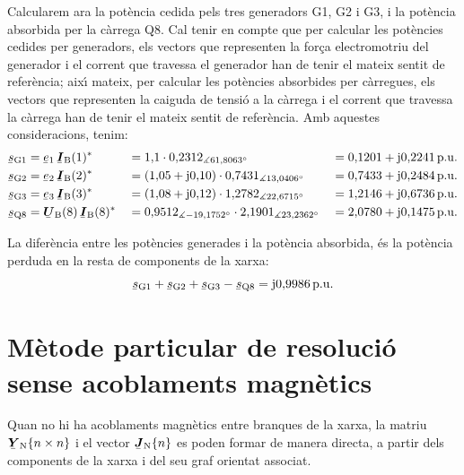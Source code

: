 \begin{exemple}
Calcularem ara la pot\`{e}ncia cedida pels tres generadors G1, G2 i G3, i la pot\`{e}ncia absorbida per la c\`{a}rrega Q8. Cal tenir en compte que per calcular les pot\`{e}ncies cedides per generadors, els vectors que representen la for\c{c}a electromotriu del generador i el corrent que travessa el generador han de tenir el mateix sentit de refer\`{e}ncia; aix\'{\i} mateix, per calcular les pot\`{e}ncies absorbides per c\`{a}rregues, els vectors que representen la caiguda de tensi\'{o} a la c\`{a}rrega i el corrent que travessa la c\`{a}rrega han de tenir el mateix sentit de refer\`{e}ncia. Amb aquestes consideracions, tenim:
\begin{alignat*}{3}
   \cmplx{s}\ped{G1} &= \cmplx{e}\ped{1} \, \mcmplx{I}\ped{B}(1)^* &&= 1{,}1 \cdot
    0{,}2312_{\measuredangle 61{,}8063\degree} &&= 0{,}1201 + \ju 0{,}2241 \unit{p.u.} \\
   \cmplx{s}\ped{G2} &= \cmplx{e}\ped{2} \, \mcmplx{I}\ped{B}(2)^* &&=
   (1{,}05 + \ju 0{,}10) \cdot 0{,}7431_{\measuredangle 13{,}0406\degree} &&=
   0{,}7433 + \ju 0{,}2484\unit{p.u.}   \\
   \cmplx{s}\ped{G3} &= \cmplx{e}\ped{3} \, \mcmplx{I}\ped{B}(3)^* &&=
   (1{,}08 + \ju 0{,}12) \cdot 1{,}2782_{\measuredangle 22{,}6715\degree} &&=
   1{,}2146 + \ju 0{,}6736\unit{p.u.}   \\
   \cmplx{s}\ped{Q8} &= \mcmplx{U}\ped{B}(8) \, \mcmplx{I}\ped{B}(8)^* &&=
   0{,}9512_{\measuredangle -19{,}1752\degree} \cdot 2{,}1901_{\measuredangle          23{,}2362\degree}     &&= 2{,}0780 + \ju 0{,}1475\unit{p.u.}
\end{alignat*}

La difer\`{e}ncia entre les pot\`{e}ncies generades i la pot\`{e}ncia absorbida, \'{e}s la pot\`{e}ncia perduda en la resta de components de la xarxa:
\[
   \cmplx{s}\ped{G1} + \cmplx{s}\ped{G2} + \cmplx{s}\ped{G3} -
   \cmplx{s}\ped{Q8} = \ju 0{,}9986\unit{p.u.}
\]
\end{exemple}


\section{M\`{e}tode particular de resoluci\'{o} sense acoblaments magn\`{e}tics}

Quan no hi ha acoblaments magn\`{e}tics entre branques de la xarxa, la matriu $\mcmplx{Y}\ped{N}\{n \times n\}$ i el vector $\mcmplx{J}\ped{N}\{n\}$ es poden formar de manera directa, a partir dels components de la xarxa i del seu graf orientat associat.

